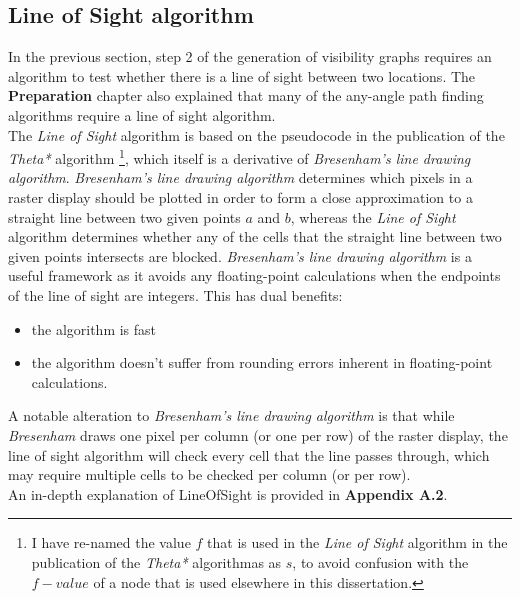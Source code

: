 \documentclass[12pt,notitlepage]{report}
\begin{document}
\subsection{Line of Sight algorithm}
In the previous section, step 2 of the generation of visibility graphs requires an algorithm to test whether there is a line of sight between two locations. The {\bfseries Preparation} chapter also explained that many of the any-angle path finding algorithms require a line of sight algorithm.\\

\noindent
The {\em Line of Sight} algorithm is based on the pseudocode in the publication of the {\em Theta*} algorithm \cite{Daniel10}\footnote{I have re-named the value $f$ that is used in the {\em Line of Sight} algorithm in the publication of the {\em Theta*} algorithmas as $s$, to avoid confusion with the $f-value$ of a node that is used elsewhere in this dissertation.}, which itself is a derivative of {\em Bresenham's line drawing algorithm}\cite{Bresenham65}. {\em Bresenham's line drawing algorithm} determines which pixels in a raster display should be plotted in order to form a close approximation to a straight line between two given points $a$ and $b$, whereas the {\em Line of Sight} algorithm determines whether any of the cells that the straight line between two given points intersects are blocked. {\em Bresenham's line drawing algorithm} is a useful framework as it avoids any floating-point calculations when the endpoints of the line of sight are integers. This has dual benefits:
\begin{itemize}
\item the algorithm is fast
\item the algorithm doesn't suffer from rounding errors inherent in floating-point calculations. 
\end{itemize}
\noindent
A notable alteration to {\em Bresenham's line drawing algorithm} is that while {\em Bresenham} draws one pixel per column (or one per row) of the raster display, the line of sight algorithm will check every cell that the line passes through, which may require multiple cells to be checked per column (or per row).\\

\noindent
An in-depth explanation of {\sc LineOfSight} is provided in {\bfseries Appendix A.2}.
\end{document}
